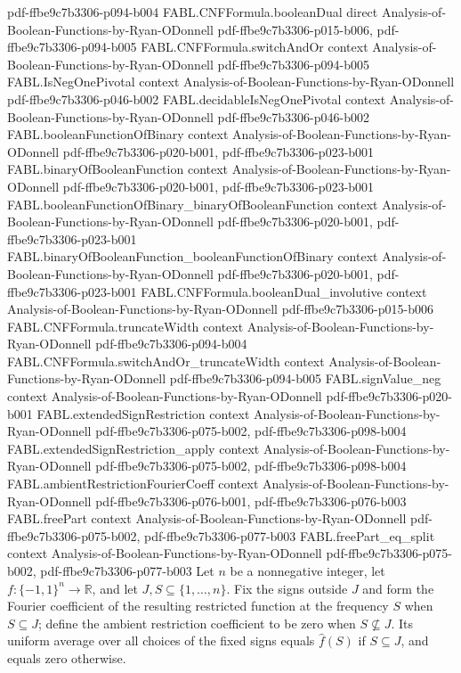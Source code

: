 \begin{theorem}
  {pdf-ffbe9c7b3306-p094-b004}
\proofstep
  {FABL.CNFFormula.booleanDual}
  {direct}
  {Analysis-of-Boolean-Functions-by-Ryan-ODonnell}
  {pdf-ffbe9c7b3306-p015-b006,
    pdf-ffbe9c7b3306-p094-b005}
\proofstep
  {FABL.CNFFormula.switchAndOr}
  {context}
  {Analysis-of-Boolean-Functions-by-Ryan-ODonnell}
  {pdf-ffbe9c7b3306-p094-b005}
\proofstep
  {FABL.IsNegOnePivotal}
  {context}
  {Analysis-of-Boolean-Functions-by-Ryan-ODonnell}
  {pdf-ffbe9c7b3306-p046-b002}
\proofstep
  {FABL.decidableIsNegOnePivotal}
  {context}
  {Analysis-of-Boolean-Functions-by-Ryan-ODonnell}
  {pdf-ffbe9c7b3306-p046-b002}
\proofstep
  {FABL.booleanFunctionOfBinary}
  {context}
  {Analysis-of-Boolean-Functions-by-Ryan-ODonnell}
  {pdf-ffbe9c7b3306-p020-b001,
    pdf-ffbe9c7b3306-p023-b001}
\proofstep
  {FABL.binaryOfBooleanFunction}
  {context}
  {Analysis-of-Boolean-Functions-by-Ryan-ODonnell}
  {pdf-ffbe9c7b3306-p020-b001,
    pdf-ffbe9c7b3306-p023-b001}
\proofstep
  {FABL.booleanFunctionOfBinary_binaryOfBooleanFunction}
  {context}
  {Analysis-of-Boolean-Functions-by-Ryan-ODonnell}
  {pdf-ffbe9c7b3306-p020-b001,
    pdf-ffbe9c7b3306-p023-b001}
\proofstep
  {FABL.binaryOfBooleanFunction_booleanFunctionOfBinary}
  {context}
  {Analysis-of-Boolean-Functions-by-Ryan-ODonnell}
  {pdf-ffbe9c7b3306-p020-b001,
    pdf-ffbe9c7b3306-p023-b001}
\proofstep
  {FABL.CNFFormula.booleanDual_involutive}
  {context}
  {Analysis-of-Boolean-Functions-by-Ryan-ODonnell}
  {pdf-ffbe9c7b3306-p015-b006}
\proofstep
  {FABL.CNFFormula.truncateWidth}
  {context}
  {Analysis-of-Boolean-Functions-by-Ryan-ODonnell}
  {pdf-ffbe9c7b3306-p094-b004}
\proofstep
  {FABL.CNFFormula.switchAndOr_truncateWidth}
  {context}
  {Analysis-of-Boolean-Functions-by-Ryan-ODonnell}
  {pdf-ffbe9c7b3306-p094-b005}
\proofstep
  {FABL.signValue_neg}
  {context}
  {Analysis-of-Boolean-Functions-by-Ryan-ODonnell}
  {pdf-ffbe9c7b3306-p020-b001}
\proofstep
  {FABL.extendedSignRestriction}
  {context}
  {Analysis-of-Boolean-Functions-by-Ryan-ODonnell}
  {pdf-ffbe9c7b3306-p075-b002,
    pdf-ffbe9c7b3306-p098-b004}
\proofstep
  {FABL.extendedSignRestriction_apply}
  {context}
  {Analysis-of-Boolean-Functions-by-Ryan-ODonnell}
  {pdf-ffbe9c7b3306-p075-b002,
    pdf-ffbe9c7b3306-p098-b004}
\proofstep
  {FABL.ambientRestrictionFourierCoeff}
  {context}
  {Analysis-of-Boolean-Functions-by-Ryan-ODonnell}
  {pdf-ffbe9c7b3306-p076-b001,
    pdf-ffbe9c7b3306-p076-b003}
\proofstep
  {FABL.freePart}
  {context}
  {Analysis-of-Boolean-Functions-by-Ryan-ODonnell}
  {pdf-ffbe9c7b3306-p075-b002,
    pdf-ffbe9c7b3306-p077-b003}
\proofstep
  {FABL.freePart_eq_split}
  {context}
  {Analysis-of-Boolean-Functions-by-Ryan-ODonnell}
  {pdf-ffbe9c7b3306-p075-b002,
    pdf-ffbe9c7b3306-p077-b003}
Let $n$ be a nonnegative integer, let $f:\{-1,1\}^n\to\mathbb{R}$, and let
$J,S\subseteq\{1,\ldots,n\}$. Fix the signs outside $J$ and form the Fourier coefficient
of the resulting restricted function at the frequency $S$ when $S\subseteq J$; define
the ambient restriction coefficient to be zero when $S\nsubseteq J$. Its uniform average
over all choices of the fixed signs equals $\widehat f(S)$ if $S\subseteq J$, and equals
zero otherwise.
\end{theorem}

